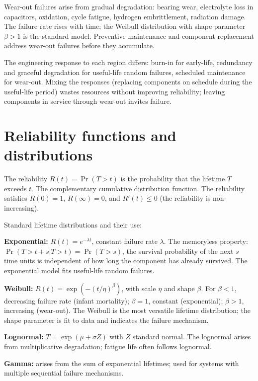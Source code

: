 Wear-out failures arise from gradual degradation: bearing wear, electrolyte loss in capacitors, oxidation, cycle fatigue, hydrogen embrittlement, radiation damage. The failure rate rises with time; the Weibull distribution with shape parameter $\beta > 1$ is the standard model. Preventive maintenance and component replacement address wear-out failures before they accumulate.

The engineering response to each region differs: burn-in for early-life, redundancy and graceful degradation for useful-life random failures, scheduled maintenance for wear-out. Mixing the responses (replacing components on schedule during the useful-life period) wastes resources without improving reliability; leaving components in service through wear-out invites failure.

\section{Reliability functions and distributions}

The reliability $R(t) = \Pr(T > t)$ is the probability that the lifetime $T$ exceeds $t$. The complementary cumulative distribution function. The reliability satisfies $R(0) = 1$, $R(\infty) = 0$, and $R'(t) \leq 0$ (the reliability is non-increasing).

Standard lifetime distributions and their use:

\textbf{Exponential:} $R(t) = e^{-\lambda t}$, constant failure rate $\lambda$. The memoryless property: $\Pr(T > t + s | T > t) = \Pr(T > s)$, the survival probability of the next $s$ time units is independent of how long the component has already survived. The exponential model fits useful-life random failures.

\textbf{Weibull:} $R(t) = \exp(-(t/\eta)^\beta)$, with scale $\eta$ and shape $\beta$. For $\beta < 1$, decreasing failure rate (infant mortality); $\beta = 1$, constant (exponential); $\beta > 1$, increasing (wear-out). The Weibull is the most versatile lifetime distribution; the shape parameter is fit to data and indicates the failure mechanism.

\textbf{Lognormal:} $T = \exp(\mu + \sigma Z)$ with $Z$ standard normal. The lognormal arises from multiplicative degradation; fatigue life often follows lognormal.

\textbf{Gamma:} arises from the sum of exponential lifetimes; used for systems with multiple sequential failure mechanisms.

